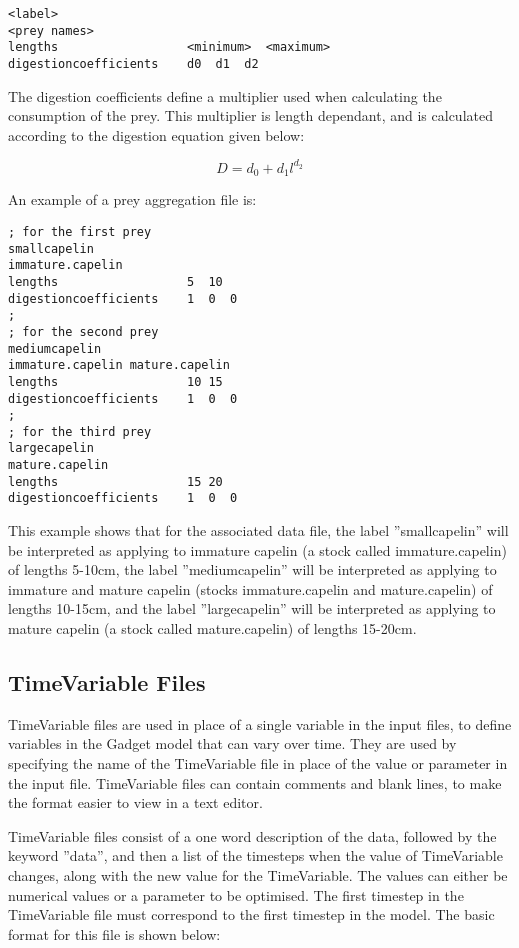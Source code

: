 \documentclass[10pt,twoside]{book}
\begin{document}
{\small\begin{verbatim}
<label>
<prey names>
lengths                  <minimum>  <maximum>
digestioncoefficients    d0  d1  d2
\end{verbatim}}

The digestion coefficients define a multiplier used when calculating the consumption of the prey.  This multiplier is length dependant, and is calculated according to the digestion equation given below:

\begin{equation}\label{eq:digestion}
D = d_{0} + d_{1}l^{d_{2}}
\end{equation}

\bigskip
An example of a prey aggregation file is:

{\small\begin{verbatim}
; for the first prey
smallcapelin
immature.capelin
lengths                  5  10
digestioncoefficients    1  0  0
;
; for the second prey
mediumcapelin
immature.capelin mature.capelin
lengths                  10 15
digestioncoefficients    1  0  0
;
; for the third prey
largecapelin
mature.capelin
lengths                  15 20
digestioncoefficients    1  0  0
\end{verbatim}}

This example shows that for the associated data file, the label ''smallcapelin'' will be interpreted as applying to immature capelin (a stock called immature.capelin) of lengths 5-10cm, the label ''mediumcapelin'' will be interpreted as applying to immature and mature capelin (stocks immature.capelin and mature.capelin) of lengths 10-15cm, and the label ''largecapelin'' will be interpreted as applying to mature capelin (a stock called mature.capelin) of lengths 15-20cm.

\subsection{TimeVariable Files}
TimeVariable files are used in place of a single variable in the input files, to define variables in the Gadget model that can vary over time.  They are used by specifying the name of the TimeVariable file in place of the value or parameter in the input file.  TimeVariable files can contain comments and blank lines, to make the format easier to view in a text editor.

\bigskip
TimeVariable files consist of a one word description of the data, followed by the keyword ''data'', and then a list of the timesteps when the value of TimeVariable changes, along with the new value for the TimeVariable.  The values can either be numerical values or a parameter to be optimised.  The first timestep in the TimeVariable file must correspond to the first timestep in the model.  The basic format for this file is shown below:
\end{document}
